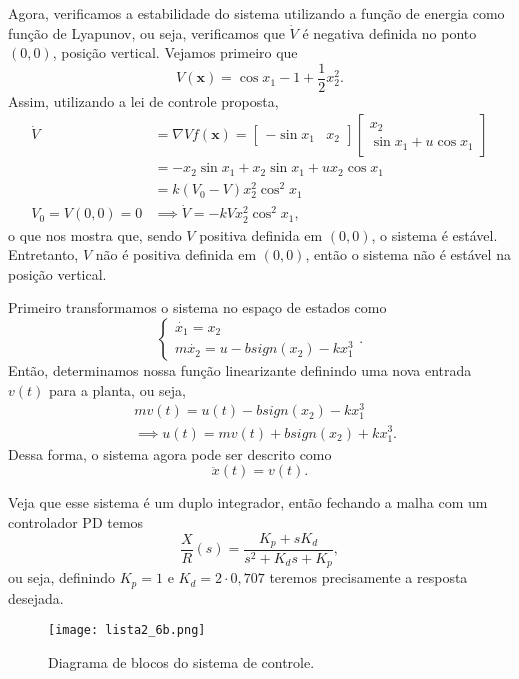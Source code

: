\documentclass[a4paper]{report}
\begin{document}
Agora, verificamos a estabilidade do sistema utilizando a função de energia como função de Lyapunov, ou seja, verificamos que $\dot{V}$ é negativa definida no ponto $(0,0)$, posição vertical. Vejamos primeiro que \[
    V(\bm{x}) = \cos x_1 - 1 + \frac{1}{2}x_2^2
.\] Assim, utilizando a lei de controle proposta,
\begin{align*}
    \dot{V} &= \nabla V f(\bm{x}) = \begin{bmatrix} -\sin x_1 & x_2 \end{bmatrix} \begin{bmatrix} x_2 \\ \sin x_1 + u \cos x_1 \end{bmatrix} \\
    &= -x_2\sin x_1 + x_2 \sin x_1 + ux_2\cos x_1 \\
    &= k\left( V_0 -V \right) x_2^2 \cos^2 x_1 \\
    V_0 = V(0,0) = 0 &\implies \dot{V} = -kVx_2^2\cos^2x_1
,\end{align*}
o que nos mostra que, sendo $V$ positiva definida em $(0,0)$, o sistema é estável. Entretanto, $V$ não é positiva definida em $(0,0)$, então o sistema não é estável na posição vertical.



Primeiro transformamos o sistema no espaço de estados como \[
\begin{cases}
    \dot{x_1} = x_2 \\
    m \dot{x_2} = u - b sign(x_2) -kx_1^3
\end{cases}
.\] Então, determinamos nossa função linearizante definindo uma nova entrada $v(t)$ para a planta, ou seja,
\begin{align*}
    &m v(t) = u(t) - b sign(x_2) - kx_1^3 \\
    &\implies u(t) = mv(t) + bsign\left( x_2 \right) +k x_1^3
.\end{align*}
Dessa forma, o sistema agora pode ser descrito como \[
\ddot{x}(t) = v(t)
.\] 

Veja que esse sistema é um duplo integrador, então fechando a malha com um controlador PD temos \[
    \frac{X}{R}(s) = \frac{K_p + sK_d}{s^2 + K_d s + K_p}
,\] ou seja, definindo $K_p = 1$ e  $K_d = 2\cdot 0,707$ teremos precisamente a resposta desejada.


\begin{figure}[H]
    \centering
    \texttt{[image: lista2\_6b.png]}
    \caption{Diagrama de blocos do sistema de controle.}
    \label{fig:lista2_6b-png}
\end{figure}
\end{document}
